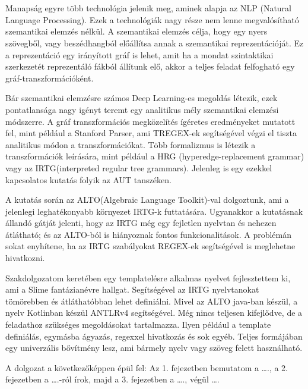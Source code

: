\chapter{\bevezetes}

Manapság egyre több technológia jelenik meg, aminek alapja az NLP (Natural Language Processing). Ezek a technológiák nagy része nem lenne megvalósítható szemantikai elemzés nélkül. A szemantikai elemzés célja, hogy egy nyers szövegből, vagy beszédhangból előállítsa annak a szemantikai reprezentációját. Ez a reprezentáció egy irányított gráf is lehet, amit ha a mondat szintaktikai szerkezetét reprezentáló fákból állítunk elő, akkor a teljes feladat felfogható egy gráf-transzformációként. 

Bár szemantikai elemzésre számos Deep Learning-es megoldás létezik, ezek pontatlansága nagy igényt teremt egy analitikus mély szemantikai elemzési módszerre. A gráf transzformációs megközelítés ígéretes eredményeket mutatott fel, mint például a Stanford Parser, ami TREGEX-ek segítségével végzi el tiszta analitikus módon a transzformációkat.
Több formalizmus is létezik a transzformációk leírására, mint például a HRG (hyperedge-replacement grammar) vagy az IRTG(interpreted regular tree grammars). Jelenleg is egy ezekkel kapcsolatos kutatás folyik az AUT tanszéken.

A kutatás során az ALTO(Algebraic Language Toolkit)-val dolgoztunk, ami a jelenlegi leghatékonyabb környezet IRTG-k futtatására. Ugyanakkor a kutatásnak állandó gátját jelenti, hogy az IRTG még egy fejletlen nyelvtan és nehezen átlátható; és az ALTO-ból is hiányoznak fontos funkcionalitások. A problémán sokat enyhítene, ha az IRTG szabályokat REGEX-ek segítségével is meglehetne hivatkozni.

Szakdolgozatom keretében egy templatelésre alkalmas nyelvet fejlesztettem ki, ami a Slime fantázianévre hallgat. Segítségével az IRTG nyelvtanokat tömörebben és átláthatóbban lehet definiálni. Mivel az ALTO java-ban készül, a nyelv Kotlinban készül ANTLRv4 segítségével. Még nincs teljesen kifejlődve, de a feladathoz szükséges megoldásokat tartalmazza. Ilyen például a template definiálás, egymásba ágyazás, regexxel hivatkozás és sok egyéb. Teljes formájában egy univerzális bővítmény lesz, ami bármely nyelv vagy szöveg felett használható.
 	 	 	
A dolgozat a következőképpen épül fel: Az 1. fejezetben bemutatom a …., a 2. fejezetben a ….-ról írok, majd a 3. fejezetben a …., végül ….
